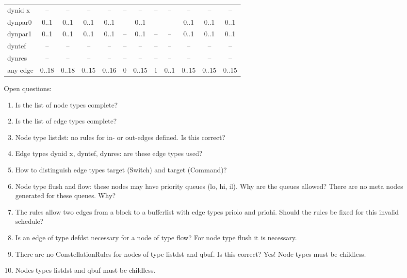 \begin{table}
\begin{adjustwidth}{-25mm}{}
\begin{tabular}[t]{|l|c|c|c|c|c|c|c|c|c|c|c|}
dynid x          & --    & --         & --    & --    & --      & --    & --   & --    & --     & --    & --    \\
dynpar0          & 0..1  & 0..1       & 0..1  & 0..1  & --      & 0..1  & --   & --    & 0..1   & 0..1  & 0..1  \\
dynpar1          & 0..1  & 0..1       & 0..1  & 0..1  & --      & 0..1  & --   & --    & 0..1   & 0..1  & 0..1  \\
dyntef           & --    & --         & --    & --    & --      & --    & --   & --    & --     & --    & --    \\
dynres           & --    & --         & --    & --    & --      & --    & --   & --    & --     & --    & --    \\
any edge         & 0..18 & 0..18      & 0..15 & 0..16 & 0       & 0..15 & 1    & 0..1  & 0..15  & 0..15 & 0..15 \\
\hline
\end{tabular}
\end{adjustwidth}
\end{table}

Open questions:
\begin{enumerate}
\item Is the list of node types complete?
\item Is the list of edge types complete?
\item Node type listdst: no rules for in- or out-edges defined. Is this correct?
\item Edge types dynid x, dyntef, dynres: are these edge types used?
\item How to distinguish edge types target (Switch) and target (Command)?
\item Node type flush and flow: these nodes may have priority queues (lo, hi, il). Why are the queues allowed?
There are no meta nodes generated for these queues. Why?
\item The rules allow two edges from a block to a bufferlist with edge types priolo and priohi.
Should the rules be fixed for this invalid schedule?
\item Is an edge of type defdst necessary for a node of type flow? For node type flush it is necessary.
\item There are no ConstellationRules for nodes of type listdst and qbuf. Is this correct? Yes! Node types must be childless.
\item Nodes types listdst and qbuf must be childless.
\end{enumerate}

